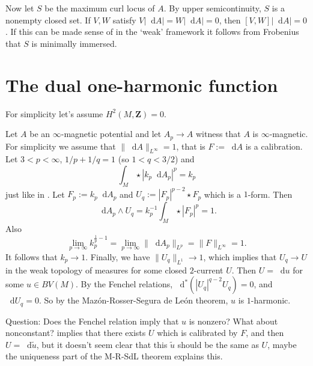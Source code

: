 \documentclass[reqno,11pt]{amsart}
\newcommand{\ZZ}{\mathbf{Z}}
\newcommand*\dif{\mathop{}\!\mathrm{d}}
\theoremstyle{definition}
\numberwithin{equation}{section}
\begin{document}
Now let $S$ be the maximum curl locus of $A$.
By upper semicontinuity, $S$ is a nonempty closed set.
If $V, W$ satisfy $V|\dif A| = W|\dif A| = 0$, then $[V, W]|\dif A| = 0$.
If this can be made sense of in the `weak' framework it follows from Frobenius that $S$ is minimally immersed.



\section{The dual one-harmonic function}
For simplicity let's assume $H^2(M, \ZZ) = 0$.

Let $A$ be an $\infty$-magnetic potential and let $A_p \to A$ witness that $A$ is $\infty$-magnetic.
For simplicity we assume that $\|\dif A\|_{L^\infty} = 1$, that is $F := \dif A$ is a calibration.
Let $3 < p < \infty$, $1/p + 1/q = 1$ (so $1 < q < 3/2$) and
$$\int_M \star |k_p \dif A_p|^p = k_p$$
just like in \cite[\S3.2]{daskalopoulos2020transverse}.
Let $F_p := k_p \dif A_p$ and $U_q := |F_p|^{p - 2} \star F_p$ which is a $1$-form.
Then 
$$\dif A_p \wedge U_q = k_p^{-1} \int_M \star |F_p|^p = 1.$$
Also 
$$\lim_{p \to \infty} k_p^{\frac{1}{p} - 1} = \lim_{p \to \infty} \|\dif A_p\|_{L^p} = \|F\|_{L^\infty} = 1.$$
It follows that $k_p \to 1$.
Finally, we have $\|U_q\|_{L^1} \to 1$, which implies that $U_q \to U$ in the weak topology of measures for some closed $2$-current $U$.
Then $U = \dif u$ for some $u \in BV(M)$.
By the Fenchel relations, $\dif^*(|U_q|^{q - 2} U_q) = 0$, and $\dif U_q = 0$.
So by the Maz\'on-Rosser-Segura de Le\'on theorem, $u$ is $1$-harmonic.

Question: Does the Fenchel relation imply that $u$ is nonzero?
What about nonconstant?
\cite{bangert_cui_2017} implies that there exists $U$ which is calibrated by $F$, and then $U = \dif \tilde u$, but it doesn't seem clear that this $\tilde u$ should be the same as $U$, maybe the uniqueness part of the M-R-SdL theorem explains this.
\end{document}
